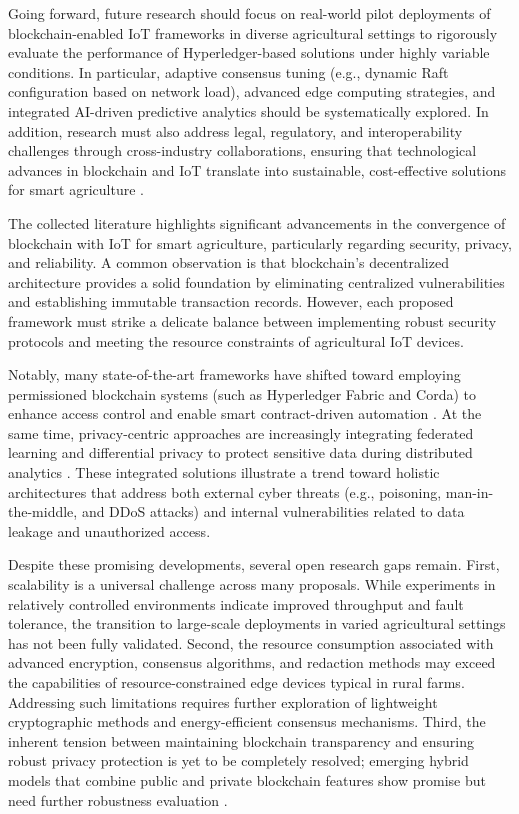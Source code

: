 \documentclass[12pt,onecolumn]{IEEEtran} %
\begin{document}
Going forward, future research should focus on real-world pilot deployments of blockchain-enabled IoT frameworks in diverse agricultural settings to rigorously evaluate the performance of Hyperledger-based solutions under highly variable conditions. In particular, adaptive consensus tuning (e.g., dynamic Raft configuration based on network load), advanced edge computing strategies, and integrated AI-driven predictive analytics should be systematically explored. In addition, research must also address legal, regulatory, and interoperability challenges through cross-industry collaborations, ensuring that technological advances in blockchain and IoT translate into sustainable, cost-effective solutions for smart agriculture \cite{bodkhe2022blockchainforprecision, yakubu2022ricechainsecureand}.

The collected literature highlights significant advancements in the convergence of blockchain with IoT for smart agriculture, particularly regarding security, privacy, and reliability. A common observation is that blockchain's decentralized architecture provides a solid foundation by eliminating centralized vulnerabilities and establishing immutable transaction records. However, each proposed framework must strike a delicate balance between implementing robust security protocols and meeting the resource constraints of agricultural IoT devices.

Notably, many state-of-the-art frameworks have shifted toward employing permissioned blockchain systems (such as Hyperledger Fabric and Corda) to enhance access control and enable smart contract-driven automation \cite{aliyu2023blockchainbasedsmartfarm, soy2025blockchainintegrationin}. At the same time, privacy-centric approaches are increasingly integrating federated learning and differential privacy to protect sensitive data during distributed analytics \cite{daund2025designofan}. These integrated solutions illustrate a trend toward holistic architectures that address both external cyber threats (e.g., poisoning, man-in-the-middle, and DDoS attacks) and internal vulnerabilities related to data leakage and unauthorized access.

Despite these promising developments, several open research gaps remain. First, scalability is a universal challenge across many proposals. While experiments in relatively controlled environments indicate improved throughput and fault tolerance, the transition to large-scale deployments in varied agricultural settings has not been fully validated. Second, the resource consumption associated with advanced encryption, consensus algorithms, and redaction methods may exceed the capabilities of resource-constrained edge devices typical in rural farms. Addressing such limitations requires further exploration of lightweight cryptographic methods and energy-efficient consensus mechanisms. Third, the inherent tension between maintaining blockchain transparency and ensuring robust privacy protection is yet to be completely resolved; emerging hybrid models that combine public and private blockchain features show promise but need further robustness evaluation \cite{soy2025blockchainintegrationin}.
\end{document}
